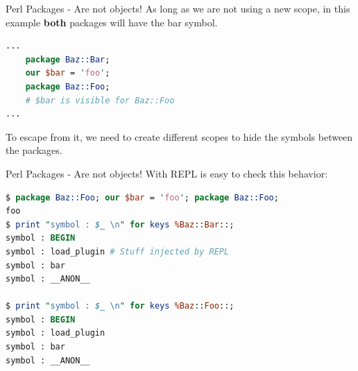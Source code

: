 \documentclass[10pt]{beamer}
\begin{document}



\begin{frame}[fragile]{Perl Packages - Are not objects!}
As long as we are not using a new scope, in this example \textbf{both} packages will have the bar symbol.

\begin{lstlisting}[language=perl]
...
    package Baz::Bar;
    our $bar = 'foo';
    package Baz::Foo;
    # $bar is visible for Baz::Foo
...
\end{lstlisting}

\pause
To escape from it, we need to create different scopes to hide the symbols between the packages.

\end{frame}

\begin{frame}[fragile]{Perl Packages - Are not objects!}
With REPL is easy to check this behavior:

\begin{lstlisting}[language=perl]
$ package Baz::Foo; our $bar = 'foo'; package Baz::Foo;
foo
$ print "symbol : $_ \n" for keys %Baz::Bar::;
symbol : BEGIN
symbol : load_plugin # Stuff injected by REPL
symbol : bar
symbol : __ANON__

$ print "symbol : $_ \n" for keys %Baz::Foo::;
symbol : BEGIN
symbol : load_plugin
symbol : bar
symbol : __ANON__
\end{lstlisting}

\end{frame}
\end{document}
